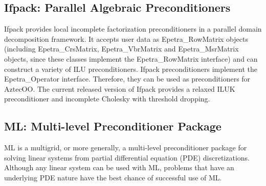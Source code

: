 \documentclass[acmtoms,acmnow]{acmtrans2m}
\begin{document}
\subsection{Ifpack: Parallel Algebraic Preconditioners}

Ifpack provides local incomplete factorization preconditioners in a
parallel domain decomposition framework.  It accepts user data as 
Epetra\_RowMatrix objects (including Epetra\_CrsMatrix, 
Epetra\_VbrMatrix and Epetra\_MsrMatrix objects, since these
classes implement the Epetra\_RowMatrix interface)
and can construct a variety of ILU preconditioners.  Ifpack 
preconditioners implement the Epetra\_Operator interface.  Therefore, 
they can be used as preconditioners for AztecOO.  The current 
released version of Ifpack provides a relaxed ILUK preconditioner and
incomplete Cholesky with threshold dropping.

\subsection{ML: Multi-level Preconditioner Package}

ML is a multigrid, or more generally, a multi-level preconditioner package for
solving linear systems
from partial differential equation (PDE) discretizations.
Although any linear system can be used with ML,
problems that have an underlying PDE nature have the best chance of successful
use of ML.
\end{document}
